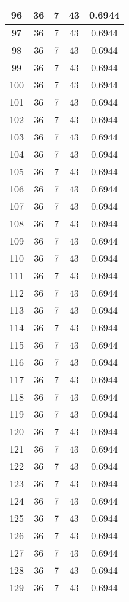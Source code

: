 \documentclass[letterpaper, 12pt]{article}
\begin{document}
\begin{longtable}{|c|c|c|c|c|}
\hline
96 & 36 & 7 & 43 & 0.6944 \\
\hline
97 & 36 & 7 & 43 & 0.6944 \\
\hline
98 & 36 & 7 & 43 & 0.6944 \\
\hline
99 & 36 & 7 & 43 & 0.6944 \\
\hline
100 & 36 & 7 & 43 & 0.6944 \\
\hline
101 & 36 & 7 & 43 & 0.6944 \\
\hline
102 & 36 & 7 & 43 & 0.6944 \\
\hline
103 & 36 & 7 & 43 & 0.6944 \\
\hline
104 & 36 & 7 & 43 & 0.6944 \\
\hline
105 & 36 & 7 & 43 & 0.6944 \\
\hline
106 & 36 & 7 & 43 & 0.6944 \\
\hline
107 & 36 & 7 & 43 & 0.6944 \\
\hline
108 & 36 & 7 & 43 & 0.6944 \\
\hline
109 & 36 & 7 & 43 & 0.6944 \\
\hline
110 & 36 & 7 & 43 & 0.6944 \\
\hline
111 & 36 & 7 & 43 & 0.6944 \\
\hline
112 & 36 & 7 & 43 & 0.6944 \\
\hline
113 & 36 & 7 & 43 & 0.6944 \\
\hline
114 & 36 & 7 & 43 & 0.6944 \\
\hline
115 & 36 & 7 & 43 & 0.6944 \\
\hline
116 & 36 & 7 & 43 & 0.6944 \\
\hline
117 & 36 & 7 & 43 & 0.6944 \\
\hline
118 & 36 & 7 & 43 & 0.6944 \\
\hline
119 & 36 & 7 & 43 & 0.6944 \\
\hline
120 & 36 & 7 & 43 & 0.6944 \\
\hline
121 & 36 & 7 & 43 & 0.6944 \\
\hline
122 & 36 & 7 & 43 & 0.6944 \\
\hline
123 & 36 & 7 & 43 & 0.6944 \\
\hline
124 & 36 & 7 & 43 & 0.6944 \\
\hline
125 & 36 & 7 & 43 & 0.6944 \\
\hline
126 & 36 & 7 & 43 & 0.6944 \\
\hline
127 & 36 & 7 & 43 & 0.6944 \\
\hline
128 & 36 & 7 & 43 & 0.6944 \\
\hline
129 & 36 & 7 & 43 & 0.6944 \\

\end{longtable}
\end{document}
